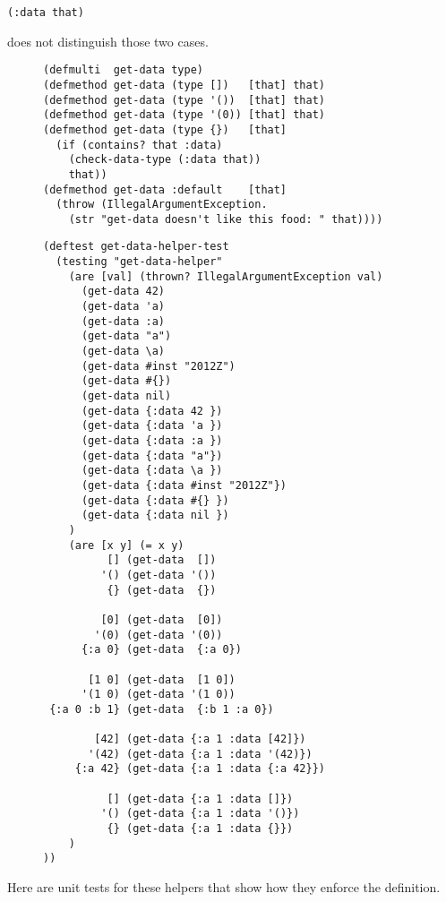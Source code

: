 \documentclass[11pt]{article}
\begin{document}
\begin{verbatim}
(:data that)
\end{verbatim}

does not distinguish those two cases.

\begin{figure}[H]
\label{get-data-helper}
\begin{verbatim}
(defmulti  get-data type)
(defmethod get-data (type [])   [that] that)
(defmethod get-data (type '())  [that] that)
(defmethod get-data (type '(0)) [that] that)
(defmethod get-data (type {})   [that]
  (if (contains? that :data)
    (check-data-type (:data that))
    that))
(defmethod get-data :default    [that]
  (throw (IllegalArgumentException.
    (str "get-data doesn't like this food: " that))))
\end{verbatim}
\end{figure}

\begin{figure}[H]
\label{test-get-data-helper}
\begin{verbatim}
(deftest get-data-helper-test
  (testing "get-data-helper"
    (are [val] (thrown? IllegalArgumentException val)
      (get-data 42)
      (get-data 'a)
      (get-data :a)
      (get-data "a")
      (get-data \a)
      (get-data #inst "2012Z")
      (get-data #{})
      (get-data nil)
      (get-data {:data 42 })
      (get-data {:data 'a })
      (get-data {:data :a })
      (get-data {:data "a"})
      (get-data {:data \a })
      (get-data {:data #inst "2012Z"})
      (get-data {:data #{} })
      (get-data {:data nil })
    )
    (are [x y] (= x y)
          [] (get-data  [])
         '() (get-data '())
          {} (get-data  {})

         [0] (get-data  [0])
        '(0) (get-data '(0))
      {:a 0} (get-data  {:a 0})

       [1 0] (get-data  [1 0])
      '(1 0) (get-data '(1 0))
 {:a 0 :b 1} (get-data  {:b 1 :a 0})

        [42] (get-data {:a 1 :data [42]})
       '(42) (get-data {:a 1 :data '(42)})
     {:a 42} (get-data {:a 1 :data {:a 42}})

          [] (get-data {:a 1 :data []})
         '() (get-data {:a 1 :data '()})
          {} (get-data {:a 1 :data {}})
    )
))
\end{verbatim}
\end{figure}

Here are unit tests for these helpers that show how they enforce the
definition.
\end{document}

